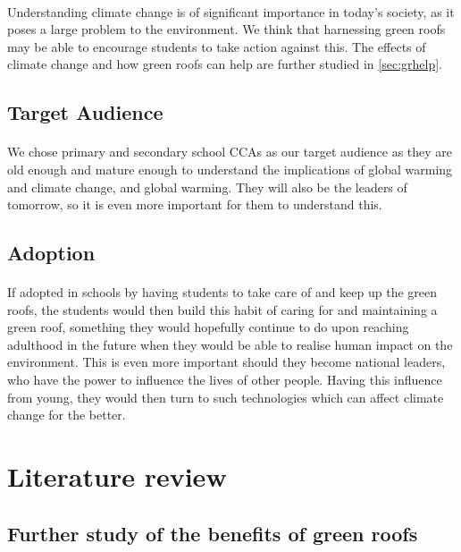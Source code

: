 \documentclass[a4paper]{article}
\begin{document}
\begin{multicols}{2}
  \paragraph{} Understanding climate change is of significant importance
  in today's society, as it poses a large problem to the environment.
  We think that harnessing green roofs may be able to encourage students
  to take action against this. The effects of climate change and how green
  roofs can help are further studied in \cref{sec:grhelp}.

  \subsection{Target Audience} \label{ssec:target-aud}
  \paragraph{} We chose primary and secondary school CCAs as our target audience as
  they are old enough and mature enough to understand the implications
  of global warming and climate change, and global warming. They will
  also be the leaders of tomorrow, so it is even more important for them
  to understand this.


  \subsection{Adoption}
  \paragraph{} If adopted in schools by having students to take care
  of and keep up the green roofs, the students would then build this
  habit of caring for and maintaining a green roof, something they would
  hopefully continue to do upon reaching adulthood in the future when
  they would be able to realise human impact on the environment. This is
  even more important should they become national leaders, who have the
  power to influence the lives of other people. Having this influence
  from young, they would then turn to such technologies which can affect
  climate change for the better.

  \section{Literature review}
  \subsection{Further study of the benefits of green roofs} \label{sec:grben}

\end{multicols}
\end{document}
